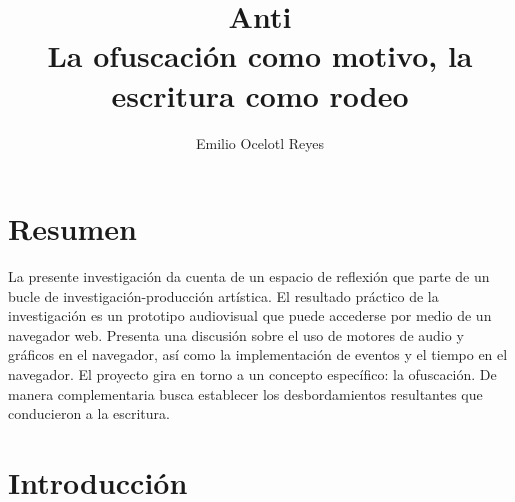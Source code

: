 \documentclass[12pt,letterpaper, twocolumn]{article}
\author{Emilio Ocelotl Reyes}
\title{Anti\\
  La ofuscación como motivo, la escritura como rodeo}
\begin{document}
\maketitle

\section*{Resumen}

La presente investigación da cuenta de un espacio de reflexión que parte de un bucle de investigación-producción artística. El resultado práctico de la investigación es un prototipo audiovisual que puede accederse por medio de un navegador web.
Presenta una discusión sobre el uso de motores de audio y gráficos en el navegador, así como la implementación de eventos y el tiempo en el navegador.
El proyecto gira en torno a un concepto específico: la ofuscación. De manera complementaria busca establecer los desbordamientos resultantes que conducieron a la escritura. 

\section*{Introducción}







\end{document}
